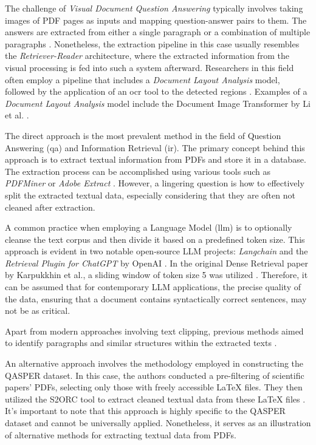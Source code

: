 The challenge of \textit{Visual Document Question Answering} typically involves taking images of PDF pages as inputs and mapping question-answer pairs to them. The answers are extracted from either a single paragraph or a combination of multiple paragraphs \cite{mathew_document_2021}. Nonetheless, the extraction pipeline in this case usually resembles the \textit{Retriever-Reader} architecture, where the extracted information from the visual processing is fed into such a system afterward. Researchers in this field often employ a pipeline that includes a \textit{Document Layout Analysis} model, followed by the application of an \gls{ocr} tool to the detected regions \cite{mcdonald_detect_2022}. Examples of a \textit{Document Layout Analysis} model include the Document Image Transformer by Li et al. \cite{li_dit_2022}.

The direct approach is the most prevalent method in the field of Question Answering (\gls{qa}) and Information Retrieval (\gls{ir}). The primary concept behind this approach is to extract textual information from PDFs and store it in a database. The extraction process can be accomplished using various tools such as \textit{PDFMiner} or \textit{Adobe Extract} \cite{meuschke_benchmark_2023}. However, a lingering question is how to effectively split the extracted textual data, especially considering that they are often not cleaned after extraction.

A common practice when employing a Language Model (\gls{llm}) is to optionally cleanse the text corpus and then divide it based on a predefined token size. This approach is evident in two notable open-source LLM projects: \textit{Langchain} and the \textit{Retrieval Plugin for ChatGPT} by OpenAI \cite{noauthor_langchain-ailangchain_nodate,noauthor_chatgpt_2023}. In the original Dense Retrieval paper by Karpukkhin et al., a sliding window of token size 5 was utilized \cite{karpukhin_dense_2020}. Therefore, it can be assumed that for contemporary LLM applications, the precise quality of the data, ensuring that a document contains syntactically correct sentences, may not be as critical.

Apart from modern approaches involving text clipping, previous methods aimed to identify paragraphs and similar structures within the extracted texts \cite{zhu_retrieving_2021}.

An alternative approach involves the methodology employed in constructing the QASPER dataset. In this case, the authors conducted a pre-filtering of scientific papers' PDFs, selecting only those with freely accessible LaTeX files. They then utilized the S2ORC tool to extract cleaned textual data from these LaTeX files \cite{dasigi_dataset_2021}. It's important to note that this approach is highly specific to the QASPER dataset and cannot be universally applied. Nonetheless, it serves as an illustration of alternative methods for extracting textual data from PDFs.

